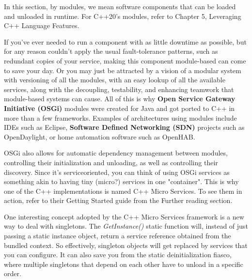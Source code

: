 \begin{tcolorbox}[colback=blue!5!white,colframe=blue!75!black, title=Note]
\hspace*{0.7cm}In this section, by modules, we mean software components that can be loaded and unloaded in runtime. For C++20's modules, refer to Chapter 5, Leveraging C++ Language Features.

\end{tcolorbox}

If you've ever needed to run a component with as little downtime as possible, but for any reason couldn't apply the usual fault-tolerance patterns, such as redundant copies of your service, making this component module-based can come to save your day. Or you may just be attracted by a vision of a modular system with versioning of all the modules, with an easy lookup of all the available services, along with the decoupling, testability, and enhancing teamwork that module-based systems can cause. All of this is why \textbf{Open Service Gateway Initiative (OSGi)} modules were created for Java and got ported to C++ in more than a few frameworks. Examples of architectures using modules include IDEs such as Eclipse, \textbf{Software Defined Networking (SDN)} projects such as OpenDaylight, or home automation software such as OpenHAB.

OSGi also allows for automatic dependency management between modules, controlling their initialization and unloading, as well as controlling their discovery. Since it's  serviceoriented, you can think of using OSGi services as something akin to having tiny (micro?) services in one "container". This is why one of the C++ implementations is named C++ Micro Services. To see them in action, refer to their Getting Started guide from the Further reading section.

One interesting concept adopted by the C++ Micro Services framework is a new way to deal with singletons. The \textit{GetInstance()} static function will, instead of just passing a static instance object, return a service reference obtained from the bundled context. So effectively, singleton objects will get replaced by services that you can configure. It can also save you from the static deinitialization fiasco, where multiple singletons that depend on each other have to unload in a specific order.





